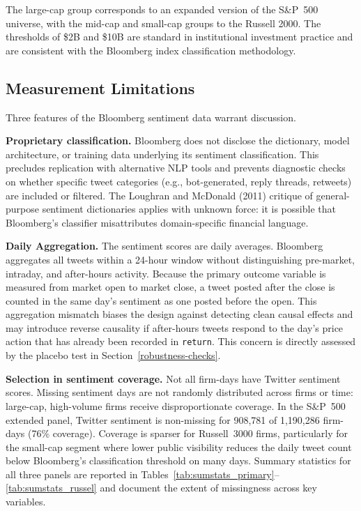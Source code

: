 The large-cap group corresponds to an expanded version of the S\&P~500
universe, with the mid-cap and small-cap groups to the Russell 2000. The
thresholds of \$2B and \$10B are standard in institutional investment
practice and are consistent with the Bloomberg index classification
methodology.

\subsection{Measurement Limitations}\label{measurement-limitations}

Three features of the Bloomberg sentiment data warrant discussion.

\textbf{Proprietary classification.} Bloomberg does not disclose the
dictionary, model architecture, or training data underlying its
sentiment classification. This precludes replication with alternative
NLP tools and prevents diagnostic checks on whether specific tweet
categories (e.g., bot-generated, reply threads, retweets) are included
or filtered. The Loughran and McDonald (2011) critique of general-purpose sentiment dictionaries
applies with unknown force: it is possible that Bloomberg's classifier
misattributes domain-specific financial language.

\textbf{Daily Aggregation.} The sentiment scores are daily averages.
Bloomberg aggregates all tweets within a 24-hour window without
distinguishing pre-market, intraday, and after-hours activity. Because
the primary outcome variable is measured from market open to market
close, a tweet posted after the close is counted in the same day's
sentiment as one posted before the open. This aggregation mismatch
biases the design against detecting clean causal effects and may
introduce reverse causality if after-hours tweets respond to the day's
price action that has already been recorded in \texttt{return}. This
concern is directly assessed by the placebo test in
Section~\ref{robustness-checks}.

\textbf{Selection in sentiment coverage.} Not all firm-days have Twitter
sentiment scores. Missing sentiment days are not randomly distributed
across firms or time: large-cap, high-volume firms receive
disproportionate coverage. In the S\&P~500 extended panel, Twitter
sentiment is non-missing for 908,781 of 1,190,286 firm-days (76\%
coverage). Coverage is sparser for Russell~3000 firms, particularly for
the small-cap segment where lower public visibility reduces the daily
tweet count below Bloomberg's classification threshold on many days.
Summary statistics for all three panels are reported in
Tables~\ref{tab:sumstats_primary}--\ref{tab:sumstats_russel} and document
the extent of missingness across key variables.

